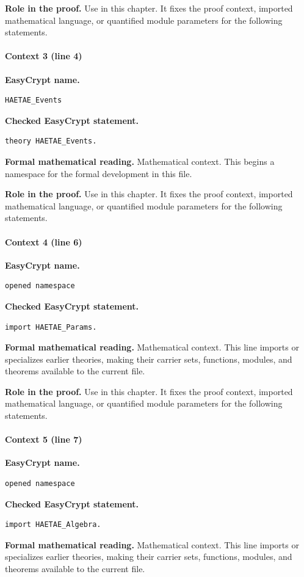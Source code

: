 \noindent\textbf{Role in the proof.}
Use in this chapter. It fixes the proof context, imported mathematical language, or quantified module parameters for the following statements.

\paragraph{Context 3 (line 4)}
\noindent\textbf{EasyCrypt name.}
\begin{lstlisting}[language=EasyCrypt,basicstyle=\ttfamily\scriptsize]
HAETAE_Events
\end{lstlisting}
\noindent\textbf{Checked EasyCrypt statement.}
\begin{lstlisting}[language=EasyCrypt,basicstyle=\ttfamily\scriptsize]
theory HAETAE_Events.
\end{lstlisting}
\noindent\textbf{Formal mathematical reading.}
Mathematical context. This begins a namespace for the formal development in this file.

\noindent\textbf{Role in the proof.}
Use in this chapter. It fixes the proof context, imported mathematical language, or quantified module parameters for the following statements.

\paragraph{Context 4 (line 6)}
\noindent\textbf{EasyCrypt name.}
\begin{lstlisting}[language=EasyCrypt,basicstyle=\ttfamily\scriptsize]
opened namespace
\end{lstlisting}
\noindent\textbf{Checked EasyCrypt statement.}
\begin{lstlisting}[language=EasyCrypt,basicstyle=\ttfamily\scriptsize]
import HAETAE_Params.
\end{lstlisting}
\noindent\textbf{Formal mathematical reading.}
Mathematical context. This line imports or specializes earlier theories, making their carrier sets, functions, modules, and theorems available to the current file.

\noindent\textbf{Role in the proof.}
Use in this chapter. It fixes the proof context, imported mathematical language, or quantified module parameters for the following statements.

\paragraph{Context 5 (line 7)}
\noindent\textbf{EasyCrypt name.}
\begin{lstlisting}[language=EasyCrypt,basicstyle=\ttfamily\scriptsize]
opened namespace
\end{lstlisting}
\noindent\textbf{Checked EasyCrypt statement.}
\begin{lstlisting}[language=EasyCrypt,basicstyle=\ttfamily\scriptsize]
import HAETAE_Algebra.
\end{lstlisting}
\noindent\textbf{Formal mathematical reading.}
Mathematical context. This line imports or specializes earlier theories, making their carrier sets, functions, modules, and theorems available to the current file.

